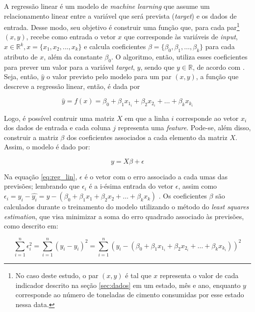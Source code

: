 A regressão linear é um modelo de \textit{machine learning} que assume um relacionamento
linear entre a variável que será prevista (\textit{target}) e os dados de entrada.
Desse modo, seu objetivo é construir uma 
função que, para cada par\footnote{No
caso deste estudo, o par  $(x,y)$ é tal que 
$x$ representa o valor de cada
indicador descrito na seção \ref{sec:dados} em um estado, mês e ano, enquanto 
$y$ corresponde ao número de toneladas de cimento consumidas
por esse estado nessa data.} $(x,y)$, recebe como
entrada o vetor $x$ que corresponde às variáveis de \textit{input},
$x \in \mathbb{R}^k , x=\{x_1, x_2, ..., x_k\}$ e calcula coeficientes
$\beta = \{\beta_0, \beta_1, \dots, \beta_k\}$ para cada atributo de $x$,
além da constante $\beta_0$. O algoritmo, então, utiliza esses coeficientes para
prever um valor para a variável \textit{target}, $y$, sendo 
que $y \in \mathbb{R}$, de acordo com \citet{forecasting}. Seja,
então, $\hat{y}$ o valor previsto pelo modelo para um 
par $(x, y)$, a função que descreve a 
regressão linear, então, é dada por

\begin{equation}
  \hat{y} = f(x) = \beta_0 + \beta_1 x_{1_i} + \beta_2 x_{2_i} + \dots + \beta_k x_{k_i} 
\end{equation}

Logo, é possível contruir uma matriz $X$ em que a linha $i$
corresponde ao vetor $x_i$ dos dados de entrada e 
cada coluna $j$ representa uma \textit{feature}. Pode-se, 
além disso, construir a matriz $\beta$ dos coeficientes associados 
a cada elemento da matriz $X$. Assim, o modelo
é dado por:

\begin{equation}
  \label{eq:reg_lin}
  y = X\beta + \epsilon
\end{equation}

Na equação \ref{eq:reg_lin}, $\epsilon$ é o vetor com o erro associado a cada umas 
das previsões; lembrando que $\epsilon_i$ é a i-ésima entrada do vetor $\epsilon$, assim como $\epsilon_i = y_i - \hat{y_i} = y - (\beta_0 + \beta_1 x_1 + \beta_2 x_2 + \dots + \beta_k x_k )$ .
Os coeficientes $\beta$ são calculados durante o treinamento 
do modelo utilizando o método do \textit{least squares estimation},
que visa minimizar a soma do erro quadrado associado às previsões, 
como descrito em:

\begin{equation}
  \sum_{i=1}^{n} \epsilon_i^2 = \sum_{i=1}^{n} (y_i - \hat{y_i})^2 = 
  \sum_{i=1}^{n} (y_i - (\beta_0 + \beta_1 x_{1_i} + \beta_2 x_{2_i} + \dots + \beta_k x_{k_i} ))^2
\end{equation}

